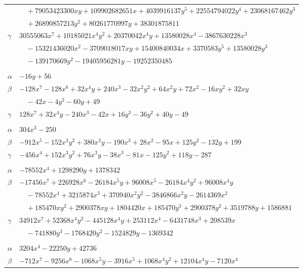 \documentclass[11pt]{article}
\begin{document}
\begin{longtable}{@{}ll@{}}
 & $\quad +79053423300xy+109902682651x+4039916137y^{5}+22554794022y^{4}+23068167462y^{3}$\\
 & $\quad +26890857213y^{2}+80261770997y+38301875811$\\
$\gamma$ & $30555063x^{7}+10185021x^{4}y^{2}+20370042x^{4}y+13580028x^{4}-3867630228x^{3}$\\
 & $\quad -15321436020x^{2}-3709018017xy+15400840034x+3370583y^{5}+13580028y^{3}$\\
 & $\quad -139170669y^{2}-19405956281y-19252350485$\\
\addlinespace[3pt]
\multicolumn{2}{@{}l}{$\{i,j\}=\{36,56\}$, $k_{ij}=3\cdot 5\cdot 7$}\\
$\alpha$ & $-16y+56$\\
$\beta$ & $-128x^{7}-128x^{6}+32x^{4}y+240x^{3}-32x^{2}y^{2}+64x^{2}y+72x^{2}-16xy^{2}+32xy$\\
 & $\quad -42x-4y^{2}-60y+49$\\
$\gamma$ & $128x^{7}+32x^{4}y-240x^{3}-42x+16y^{3}-36y^{2}+40y-49$\\
\addlinespace[3pt]
\multicolumn{2}{@{}l}{$\{i,j\}=\{36,61\}$, $k_{ij}=2^{2}\cdot 3^{4}$}\\
$\alpha$ & $304x^{3}-250$\\
$\beta$ & $-912x^{5}-152x^{3}y^{2}+380x^{3}y-190x^{3}+28x^{2}-95x+125y^{2}-132y+199$\\
$\gamma$ & $-456x^{4}+152x^{3}y^{2}+76x^{3}y-38x^{3}-81x-125y^{2}+118y-287$\\
\addlinespace[3pt]
\multicolumn{2}{@{}l}{$\{i,j\}=\{36,85\}$, $k_{ij}=2^{3}\cdot 3^{2}\cdot 5^{3}$}\\
$\alpha$ & $-78552x^{4}+1298290y+1378342$\\
$\beta$ & $-17456x^{7}+226928x^{6}-26184x^{5}y+96008x^{5}-26184x^{4}y^{2}+96008x^{4}y$\\
 & $\quad -78552x^{4}+3215874x^{3}+370940x^{2}y^{2}-3846866x^{2}y-2614369x^{2}$\\
 & $\quad +185470xy^{2}+2900378xy+1804420x+185470y^{3}+2900378y^{2}+3519788y+1586881$\\
$\gamma$ & $34912x^{7}+52368x^{4}y^{2}-445128x^{4}y+253112x^{4}-6431748x^{3}+208539x$\\
 & $\quad -741880y^{3}-1768420y^{2}-1524829y-1369342$\\
\addlinespace[3pt]
\multicolumn{2}{@{}l}{$\{i,j\}=\{36,87\}$, $k_{ij}=2^{2}\cdot 3^{3}\cdot 5^{4}$}\\
$\alpha$ & $3204x^{4}-22250y+42736$\\
$\beta$ & $-712x^{7}-9256x^{6}-1068x^{5}y-3916x^{5}+1068x^{4}y^{2}+12104x^{4}y-7120x^{4}$\\

\end{longtable}
\end{document}
